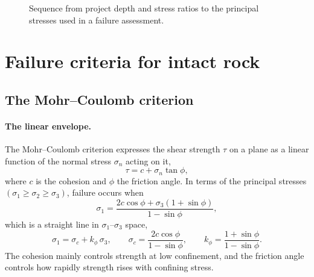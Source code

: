 \begin{figure}[htbp]
\centering
{}
\caption{Sequence from project depth and stress ratios to the principal stresses used in a failure assessment.}
\label{fig:insitu_stress_workflow}
\end{figure}

\section{Failure criteria for intact rock}
\label{sec:failure-criteria-for-intact-rock}

\subsection{The Mohr--Coulomb criterion}
\label{sec:mohr-coulomb-criterion}

\paragraph{The linear envelope.}
The Mohr--Coulomb criterion expresses the shear strength \(\tau\) on a plane
as a linear function of the normal stress \(\sigma_n\) acting on it,
\[
\tau = c + \sigma_n \tan\phi ,
\]
where \(c\) is the cohesion and \(\phi\) the friction angle. In terms of the
principal stresses \((\sigma_1 \geq \sigma_2 \geq \sigma_3)\), failure occurs
when
\[
\sigma_1 =
\frac{2c\cos\phi + \sigma_3(1+\sin\phi)}
{1-\sin\phi} ,
\]
which is a straight line in \(\sigma_1\)--\(\sigma_3\) space,
\[
\sigma_1 = \sigma_c + k_\phi\,\sigma_3 ,
\qquad
\sigma_c =
\frac{2c\cos\phi}{1-\sin\phi} ,
\qquad
k_\phi =
\frac{1+\sin\phi}{1-\sin\phi} .
\]
The cohesion mainly controls strength at low confinement, and the friction
angle controls how rapidly strength rises with confining stress.

